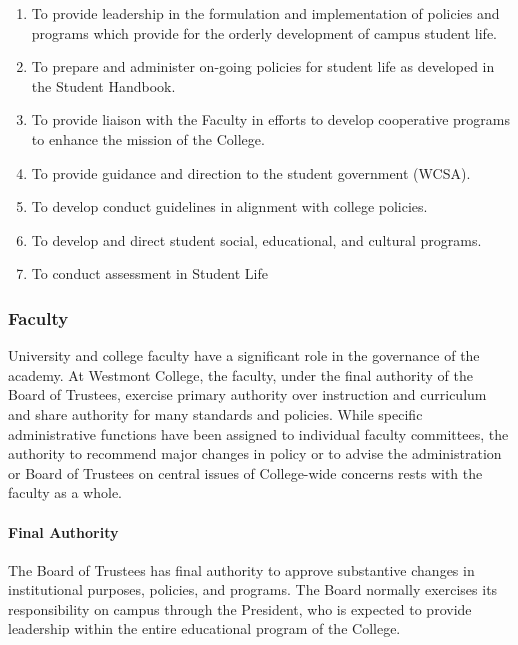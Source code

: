 \documentclass[letterpaper, 11pt]{article}
\begin{document}
\begin{enumerate}[label=\alph*)]
{\begin{enumerate}[label=\arabic*)]
{									\begin{enumerate}[label=(\alph*)]
										\item{To provide leadership in the formulation and implementation of policies and programs which provide for the orderly development of campus student life.}
										\item{To prepare and administer on-going policies for student life as developed in the Student Handbook.}
										\item{To provide liaison with the Faculty in efforts to develop cooperative programs to enhance the mission of the College.}
										\item{To provide guidance and direction to the student government (WCSA).}
										\item{To develop conduct guidelines in alignment with college policies.}
										\item{To develop and direct student social, educational, and cultural programs.}
										\item{To conduct assessment in Student Life}
									\end{enumerate}
								}
							\end{enumerate}
						}
					\end{enumerate}

		\subsubsection{Faculty}

			University and college faculty have a significant role in the
			governance of the academy. At Westmont College, the faculty, under
			the final authority of the Board of Trustees, exercise primary
			authority over instruction and curriculum and share authority for
			many standards and policies.  While specific administrative
			functions have been assigned to individual faculty committees, the
			authority to recommend major changes in policy or to advise the
			administration or Board of Trustees on central issues of
			College-wide concerns rests with the faculty as a whole.

			\paragraph{Final Authority}

				The Board of Trustees has final authority to approve substantive changes in institutional purposes, policies, and programs.  The Board normally exercises its responsibility on campus through the President, who is expected to provide leadership within the entire educational program of the College.
\end{document}
